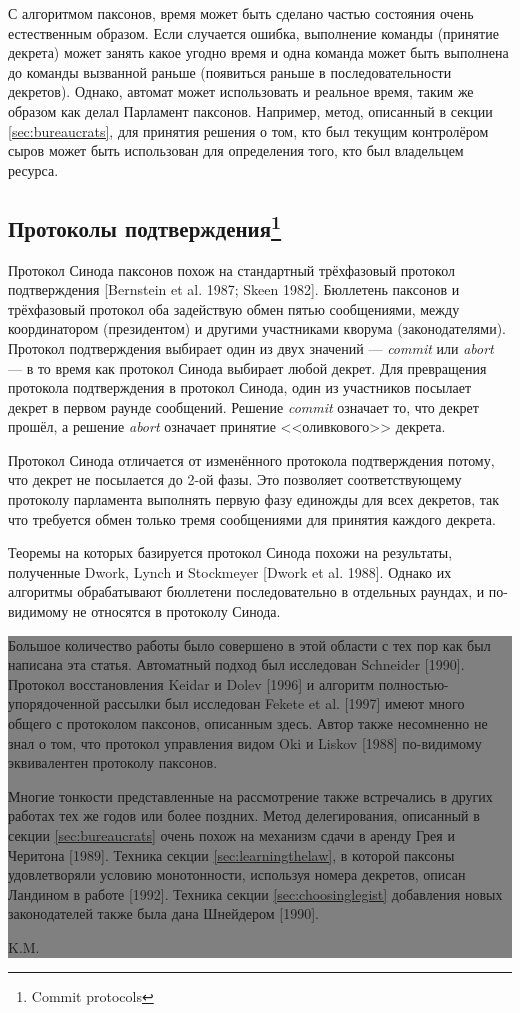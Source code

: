 \documentclass[12pt, a4paper]{article} %
\begin{document}
С алгоритмом паксонов, время может быть сделано частью состояния очень естественным образом. Если случается ошибка, выполнение команды (принятие декрета) может занять какое угодно время и одна команда может быть выполнена до команды вызванной раньше (появиться раньше в последовательности декретов). Однако, автомат может использовать и реальное время, таким же образом как делал Парламент паксонов. Например, метод, описанный в секции \ref{sec:bureaucrats}, для принятия решения о том, кто  был текущим контролёром сыров может быть использован для определения того, кто был владельцем ресурса.

\subsection{Протоколы подтверждения\footnote{Commit protocols}}

Протокол Синода паксонов похож на стандартный трёхфазовый протокол подтверждения [Bernstein et al. 1987; Skeen 1982]. Бюллетень паксонов и трёхфазовый протокол оба задействую обмен пятью сообщениями, между координатором (президентом) и другими участниками кворума (законодателями). Протокол подтверждения выбирает один из двух значений --- \textit{commit} или \textit{abort} --- в то время как протокол Синода выбирает любой декрет. Для превращения протокола подтверждения в протокол Синода, один из участников посылает декрет в первом раунде сообщений. Решение \textit{commit} означает то, что декрет прошёл, а решение \textit{abort} означает принятие <<оливкового>> декрета.

Протокол Синода отличается от изменённого протокола подтверждения потому, что декрет не посылается до 2-ой фазы. Это позволяет соответствующему протоколу парламента выполнять первую фазу единожды для всех декретов, так что требуется обмен только тремя сообщениями для принятия каждого декрета. 

Теоремы на которых базируется протокол Синода похожи на результаты, полученные Dwork, Lynch и Stockmeyer [Dwork et al. 1988]. Однако их алгоритмы обрабатывают бюллетени последовательно в отдельных раундах, и по-видимому не относятся в протоколу Синода.
\newpage
\noindent\colorbox{gray}{
 \parbox{\textwidth}{
Большое количество работы было совершено в этой области с тех пор как был написана эта статья. Автоматный подход был исследован Schneider [1990]. Протокол восстановления Keidar и Dolev [1996] и алгоритм полностью-упорядоченной рассылки был исследован Fekete et al. [1997] имеют много общего с протоколом паксонов, описанным здесь. Автор также несомненно не знал о том, что протокол управления видом Oki и Liskov [1988] по-видимому эквивалентен протоколу паксонов.

Многие тонкости представленные на рассмотрение также встречались в других работах тех же годов или более поздних. Метод делегирования, описанный в секции \ref{sec:bureaucrats} очень похож на механизм сдачи в аренду Грея и Черитона [1989].  Техника секции \ref{sec:learningthelaw}, в которой паксоны удовлетворяли условию монотонности, используя номера декретов, описан Ландином в работе [1992].  Техника секции \ref{sec:choosinglegist} добавления новых законодателей также была дана Шнейдером [1990].
\begin{flushright}
    K.M.
\end{flushright}
}}
\end{document}
